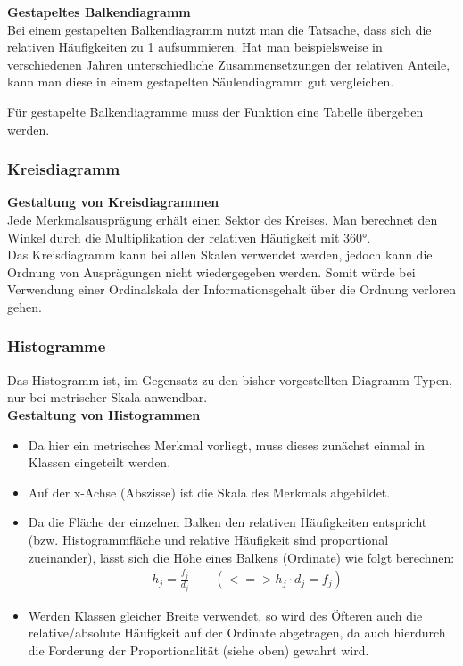 \documentclass[a4paper]{article}
\newcommand\dangersign[1][2ex]{%
  \renewcommand\stacktype{L}%
  \scaleto{\stackon[1.3pt]{\color{red}$\triangle$}{\tiny !}}{#1}%
}
\begin{document}
\noindent\textbf{Gestapeltes Balkendiagramm}\\
Bei einem gestapelten Balkendiagramm nutzt man die Tatsache, dass sich die relativen Häufigkeiten zu 1 aufsummieren. Hat man beispielsweise in verschiedenen Jahren unterschiedliche Zusammensetzungen der relativen Anteile, kann man diese in einem gestapelten Säulendiagramm gut vergleichen.\\

\noindent {}

\noindent \dangersign[3ex] Für gestapelte Balkendiagramme muss der Funktion eine Tabelle übergeben werden.

\subsubsection{Kreisdiagramm}
\textbf{Gestaltung von Kreisdiagrammen}\\
Jede Merkmalsausprägung erhält einen Sektor des Kreises. Man berechnet den Winkel durch die Multiplikation der relativen Häufigkeit mit 360°.\\
Das Kreisdiagramm kann bei allen Skalen verwendet werden, jedoch kann die Ordnung von Ausprägungen nicht wiedergegeben werden. Somit würde bei Verwendung einer Ordinalskala der Informationsgehalt über die Ordnung verloren gehen.\\

\noindent {}

\subsubsection{Histogramme}
Das Histogramm ist, im Gegensatz zu den bisher vorgestellten Diagramm-Typen, nur bei metrischer Skala anwendbar.\\
\textbf{Gestaltung von Histogrammen}
\begin{itemize}
    \item Da hier ein metrisches Merkmal vorliegt, muss dieses zunächst einmal in Klassen eingeteilt werden.
    \item Auf der x-Achse (Abszisse) ist die Skala des Merkmals abgebildet.
    \item Da die Fläche der einzelnen Balken den relativen Häufigkeiten entspricht (bzw. Histogrammfläche und relative Häufigkeit sind proportional zueinander), lässt sich die Höhe eines Balkens (Ordinate) wie folgt berechnen:
    \begin{align*} 
    &h_j = \frac{f_j}{d_j} \qquad (<=> h_j\cdot d_j = f_j) 
    \end{align*}
    \item Werden Klassen gleicher Breite verwendet, so wird des Öfteren auch die relative/absolute Häufigkeit auf der Ordinate abgetragen, da auch hierdurch die Forderung der Proportionalität (siehe oben) gewahrt wird.
\end{itemize}
\end{document}
